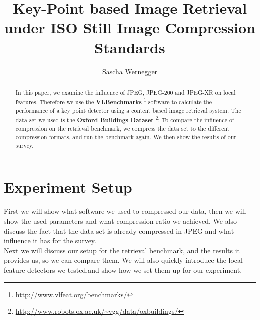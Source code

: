 \documentclass[10pt,a4paper,twocolumn]{article}
\author{Sascha Wernegger}
\title{Key-Point based Image Retrieval under ISO Still
Image Compression Standards}
\begin{document}
\maketitle

\begin{abstract}
In this paper, we examine the influence of JPEG, JPEG-200 and JPEG-XR on local features. Therefore we use the \textbf{VLBenchmarks} \footnote{\url{http://www.vlfeat.org/benchmarks/}} software to calculate the performance of a key point detector using a content based image retrieval system. The data set we used is the \textbf{Oxford Buildings Dataset} \footnote{\url{http://www.robots.ox.ac.uk/~vgg/data/oxbuildings/}};
To compare the influence of compression on the retrieval benchmark, we compress the data set to the different compression formats, and run the benchmark again. We then show the results of our survey.
\end{abstract}

\section{Experiment Setup}
First we will show what software we used to compressed our data, then we will show the used parameters and what compression ratio we achieved. We also discuss the fact that the data set is already compressed in JPEG and what influence it has for the survey.\\
Next we will discuss our setup for the retrieval benchmark, and the results it provides us, so we can compare them. We will also quickly introduce the local feature detectors we tested,and show how we set them up for our experiment.
\end{document}
